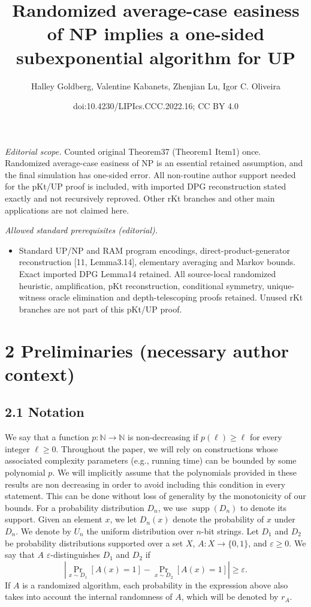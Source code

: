 \documentclass[10pt,a4paper]{article}
\title{Randomized average-case easiness of NP implies a one-sided subexponential algorithm for UP}
\author{Halley Goldberg, Valentine Kabanets, Zhenjian Lu, Igor C. Oliveira}
\date{doi:10.4230/LIPIcs.CCC.2022.16; CC BY 4.0}
\begin{document}
\maketitle
\noindent\textit{Editorial scope.} Counted original Theorem37 (Theorem1 Item1) once. Randomized average-case easiness of NP is an essential retained assumption, and the final simulation has one-sided error. All non-routine author support needed for the pKt/UP proof is included, with imported DPG reconstruction stated exactly and not recursively reproved. Other rKt branches and other main applications are not claimed here.\par\medskip
\noindent\textit{Allowed standard prerequisites (editorial).}\begin{itemize}
\item Standard UP/NP and RAM program encodings, direct-product-generator reconstruction [11, Lemma3.14], elementary averaging and Markov bounds. Exact imported DPG Lemma14 retained. All source-local randomized heuristic, amplification, pKt reconstruction, conditional symmetry, unique-witness oracle elimination and depth-telescoping proofs retained. Unused rKt branches are not part of this pKt/UP proof.
\end{itemize}\medskip
\section*{2 Preliminaries (necessary author context)}
\subsection*{2.1 Notation}
We say that a function $p:\mathbb N\to\mathbb N$ is non-decreasing if $p(\ell)\geq\ell$ for every integer $\ell\geq0$. Throughout the paper, we will rely on constructions whose associated complexity parameters (e.g., running time) can be bounded by some polynomial $p$. We will implicitly assume that the polynomials provided in these results are non decreasing in order to avoid including this condition in every statement. This can be done without loss of generality by the monotonicity of our bounds.
For a probability distribution $D_n$, we use $\operatorname{supp}(D_n)$ to denote its support. Given an element $x$, we let $D_n(x)$ denote the probability of $x$ under $D_n$. We denote by $U_n$ the uniform distribution over $n$-bit strings.
Let $D_1$ and $D_2$ be probability distributions supported over a set $X$, $A:X\to\{0,1\}$, and $\varepsilon\geq0$. We say that $A$ $\varepsilon$-distinguishes $D_1$ and $D_2$ if
\[\left|\Pr_{x\sim D_1}[A(x)=1]-\Pr_{x\sim D_2}[A(x)=1]\right|\geq\varepsilon.\]
If $A$ is a randomized algorithm, each probability in the expression above also takes into account the internal randomness of $A$, which will be denoted by $r_A$.
\end{document}
